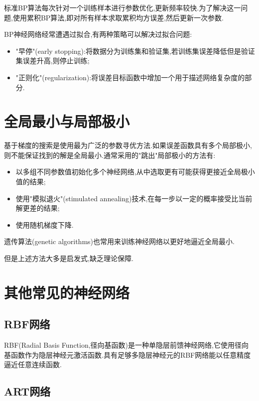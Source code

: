 标准BP算法每次针对一个训练样本进行参数优化,更新频率较快.为了解决这一问题,使用累积BP算法,即对所有样本求取累积均方误差,然后更新一次参数.

BP神经网络经常遭遇过拟合,有两种策略可以解决过拟合问题:

\begin{itemize}
\item "早停"(early stopping):将数据分为训练集和验证集,若训练集误差降低但是验证集误差升高,则停止训练;
\item "正则化"(regularization):将误差目标函数中增加一个用于描述网络复杂度的部分.
\end{itemize}

\section{全局最小与局部极小}

基于梯度的搜索是使用最为广泛的参数寻优方法.如果误差函数具有多个局部极小,则不能保证找到的解是全局最小.通常采用的"跳出"局部极小的方法有:

\begin{itemize}
\item 以多组不同参数值初始化多个神经网络,从中选取更有可能获得更接近全局极小值的结果;
\item 使用"模拟退火"(stimulated annealing)技术,在每一步以一定的概率接受比当前解更差的结果;
\item 使用随机梯度下降.
\end{itemize}

遗传算法(genetic algorithms)也常用来训练神经网络以更好地逼近全局最小.

但是上述方法大多是启发式,缺乏理论保障.

\section{其他常见的神经网络}

\subsection{RBF网络}

RBF(Radial Basis Function,径向基函数)是一种单隐层前馈神经网络,它使用径向基函数作为隐层神经元激活函数.具有足够多隐层神经元的RBF网络能以任意精度逼近任意连续函数.

\subsection{ART网络}

